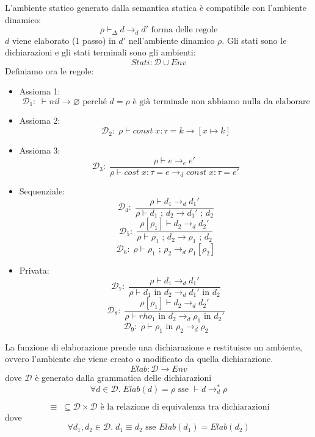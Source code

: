 \documentclass[a4paper]{article}
\begin{document}
L'ambiente statico generato dalla semantica statica è compatibile 
con l'ambiente dinamico: 
\[
  \rho \vdash_{\Delta} d \to_d d' \text{ forma delle regole}
\]
$d$ viene elaborato (1 passo) in $d'$ nell'ambiente dinamico $\rho$. 
Gli stati sono le dichiarazioni e gli stati terminali sono gli ambienti:
\[
  Stati: \mathcal{D} \cup Env
\]
Definiamo ora le regole:
\begin{itemize}
  \item Assioma 1:
  \[
    \mathcal{D}_1: \; \vdash nil \to \varnothing \text{ perché } d  = \rho \text{ è già terminale non abbiamo nulla da elaborare}
  \]
  \item Assioma 2:
  \[
    \mathcal{D}_2: \; \rho \vdash const \; x : \tau = k \to [x \mapsto k]
  \]
  \item Assioma 3: 
  \[
    \mathcal{D}_3: \; \frac{\rho \vdash e \to_e e'}{\rho \vdash cost \; x : \tau = e \to_d const \; x : \tau = e'}
  \]
  \item Sequenziale:
  \[
    \mathcal{D}_4: \; \frac{\rho \vdash d_1 \to_d d_1'}{\rho \vdash d_1 \text{ ; } d_2 \to d_1' \text{ ; } d_2}
  \]
  \[
    \mathcal{D}_5: \; \frac{\rho[\rho_1] \vdash  d_2 \to_d d_2'}{\rho \vdash \rho_1 \text{ ; } d_2 \to \rho_1 \text{ ; } d_2}
  \]
  \[
    \mathcal{D}_6: \; \rho \vdash \rho_1 \text{ ; } \rho_2 \to_d \rho_1[\rho_2]
  \]
  \item Privata: 
  \[
    \mathcal{D}_7: \; \frac{\rho \vdash d_1 \to_d d_1'}{\rho \vdash d_1 \text{ in } d_2 \to_d d_1' \text{ in } d_2}
  \]
  \[
    \mathcal{D}_8: \; \frac{\rho[\rho_1] \vdash d_2 \to_d d_2'}{\rho \vdash rho_1 \text{ in } d_2 \to_d \rho_1 \text{ in } d_2'}
  \]
  \[
    \mathcal{D}_9: \; \rho \vdash \rho_1 \text{ in } \rho_2 \to_d \rho_2
  \]
\end{itemize}

{
  La funzione di elaborazione prende una dichiarazione e restituisce un ambiente, ovvero l'ambiente che viene creato o 
  modificato da quella dichiarazione.
  \[
    Elab: \mathcal{D} \to Env
  \]
  dove $\mathcal{D}$ è generato dalla grammatica delle dichiarazioni 
  \[
    \forall d \in \mathcal{D} . \; Elab(d) = \rho \text{ sse } \vdash d \to_d^* \rho
  \]
}

{
  \[
    \equiv \; \subseteq \mathcal{D} \times \mathcal{D} \text{ è la relazione di equivalenza tra dichiarazioni}
  \]
  dove 
  \[
    \forall d_1, d_2 \in \mathcal{D} . \; d_1 \equiv d_2 \text{ sse } Elab(d_1) = Elab(d_2)
  \]
}
\end{document}
